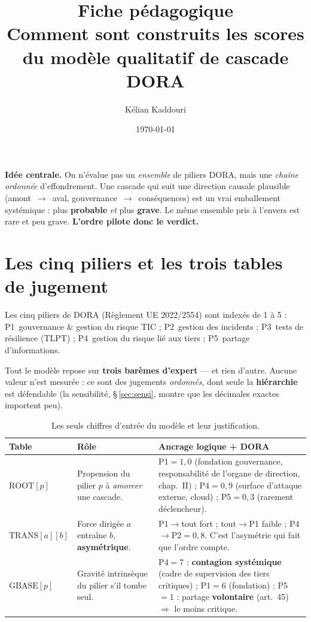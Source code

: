 \documentclass[11pt,a4paper]{article}
\title{\vspace{-1.2cm}\color{navy}\bfseries Fiche pédagogique\\[2pt]
  \large Comment sont construits les scores du modèle qualitatif de cascade DORA}
\author{Kélian Kaddouri}
\date{\today}
\newcommand{\fl}{\ensuremath{\!\rightarrow\!}}
\begin{document}
\maketitle
\vspace{-0.6cm}

\begin{cle}
\textbf{Idée centrale.} On n'évalue pas un \emph{ensemble} de piliers DORA, mais une
\emph{chaîne ordonnée} d'effondrement. Une cascade qui suit une direction causale
plausible (amont~\fl~aval, gouvernance~\fl~conséquences) est un vrai emballement
systémique : plus \textbf{probable} \emph{et} plus \textbf{grave}. Le même ensemble pris
à l'envers est rare et peu grave. \textbf{L'ordre pilote donc le verdict.}
\end{cle}

\section{Les cinq piliers et les trois tables de jugement}

Les cinq piliers de DORA (Règlement UE 2022/2554) sont indexés de 1 à 5 :
P1~gouvernance \& gestion du risque TIC ; P2~gestion des incidents ; P3~tests de
résilience (TLPT) ; P4~gestion du risque lié aux tiers ; P5~partage d'informations.

Tout le modèle repose sur \textbf{trois barèmes d'expert} --- et rien d'autre. Aucune valeur
n'est mesurée : ce sont des jugements \emph{ordonnés}, dont seule la \textbf{hiérarchie}
est défendable (la sensibilité, \S\,\ref{sec:sensi}, montre que les décimales exactes
importent peu).

\begin{table}[h]\centering\small
\renewcommand{\arraystretch}{1.25}
\begin{tabular}{@{}p{2.1cm} p{5.3cm} p{6.9cm}@{}}
\toprule
\textbf{Table} & \textbf{Rôle} & \textbf{Ancrage logique + DORA} \\
\midrule
$\text{ROOT}[p]$ & Propension du pilier $p$ à \emph{amorcer} une cascade.
  & P1$=1{,}0$ (fondation gouvernance, responsabilité de l'organe de direction, chap.~II) ;
    P4$=0{,}9$ (surface d'attaque externe, cloud) ; P5$=0{,}3$ (rarement déclencheur). \\
$\text{TRANS}[a][b]$ & Force dirigée \og{}$a$ entraîne $b$\fg{}, \textbf{asymétrique}.
  & P1$\fl$tout fort ; tout$\fl$P1 faible ; P4$\fl$P2$=0{,}8$. C'est l'asymétrie qui fait
    que l'ordre compte. \\
$\text{GBASE}[p]$ & Gravité intrinsèque du pilier s'il tombe seul.
  & P4$=7$ : \textbf{contagion systémique} (cadre de supervision des tiers critiques) ;
    P1$=6$ (fondation) ; P5$=1$ : partage \textbf{volontaire} (art.~45) $\Rightarrow$ le
    moins critique. \\
\bottomrule
\end{tabular}
\caption{Les seuls chiffres d'entrée du modèle et leur justification.}
\end{table}
\end{document}
